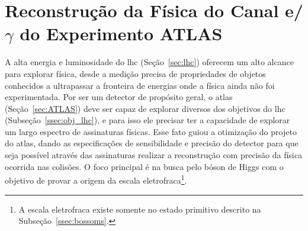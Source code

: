 \chapter[Reconstrução da Física do Canal eGamma do Experimento ATLAS]
{Reconstrução da Física do Canal e/$\gamma$ do Experimento ATLAS}
\label{cap:reco}


A alta energia e luminosidade do \gls{lhc} (Seção~\ref{sec:lhc}) oferecem um alto alcance para
explorar física, desde a medição precisa de propriedades de objetos conhecidos a
ultrapassar a fronteira de energias onde a física ainda não foi experimentada.
Por ser um detector de propósito geral, o \gls{atlas} (Seção~\ref{sec:ATLAS}) deve ser capaz de
explorar diversos dos objetivos do \gls{lhc} (Subseção~\ref{ssec:obj_lhc}), e
para isso ele precisar ter a capacidade de explorar um largo espectro de assinaturas
físicas. Esse fato guiou a otimização do projeto do \gls{atlas}, dando as especificações de sensibilidade e precisão do
detector para que seja possível através das assinaturas realizar a reconstrução
com precisão da física ocorrida nas colisões. O foco principal é na busca pelo
bóson de Higgs \cite{ATLAS_TDR2} com o objetivo de provar a origem da escala
eletrofraca\footnote{A escala eletrofraca existe somente no estado primitivo descrito na
Subseção~\ref{ssec:bossoms}.}. 


